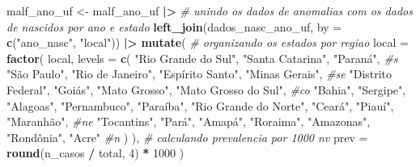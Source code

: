 \documentclass[
]{article}
\newenvironment{Shaded}{\begin{snugshade}}{\end{snugshade}}
\newcommand{\AttributeTok}[1]{\textcolor[rgb]{0.13,0.29,0.53}{#1}}
\newcommand{\CommentTok}[1]{\textcolor[rgb]{0.56,0.35,0.01}{\textit{#1}}}
\newcommand{\DecValTok}[1]{\textcolor[rgb]{0.00,0.00,0.81}{#1}}
\newcommand{\FunctionTok}[1]{\textcolor[rgb]{0.13,0.29,0.53}{\textbf{#1}}}
\newcommand{\NormalTok}[1]{#1}
\newcommand{\OtherTok}[1]{\textcolor[rgb]{0.56,0.35,0.01}{#1}}
\newcommand{\SpecialCharTok}[1]{\textcolor[rgb]{0.81,0.36,0.00}{\textbf{#1}}}
\newcommand{\StringTok}[1]{\textcolor[rgb]{0.31,0.60,0.02}{#1}}
\begin{document}
\begin{Shaded}
\begin{Highlighting}[]
\NormalTok{malf\_ano\_uf }\OtherTok{\textless{}{-}}\NormalTok{ malf\_ano\_uf }\SpecialCharTok{|\textgreater{}} 
  \CommentTok{\# unindo os dados de anomalias com os dados de nascidos por ano e estado}
  \FunctionTok{left\_join}\NormalTok{(dados\_nasc\_ano\_uf, }\AttributeTok{by =} \FunctionTok{c}\NormalTok{(}\StringTok{"ano\_nasc"}\NormalTok{, }\StringTok{"local"}\NormalTok{)) }\SpecialCharTok{|\textgreater{}} 
  \FunctionTok{mutate}\NormalTok{(}
    \CommentTok{\# organizando os estados por regiao}
    \AttributeTok{local =} \FunctionTok{factor}\NormalTok{(}
\NormalTok{      local,}
      \AttributeTok{levels =} \FunctionTok{c}\NormalTok{(}
        \StringTok{"Rio Grande do Sul"}\NormalTok{, }\StringTok{"Santa Catarina"}\NormalTok{, }\StringTok{"Paraná"}\NormalTok{, }\CommentTok{\#s}
        \StringTok{"São Paulo"}\NormalTok{, }\StringTok{"Rio de Janeiro"}\NormalTok{, }\StringTok{"Espírito Santo"}\NormalTok{, }\StringTok{"Minas Gerais"}\NormalTok{, }\CommentTok{\#se}
        \StringTok{"Distrito Federal"}\NormalTok{, }\StringTok{"Goiás"}\NormalTok{, }\StringTok{"Mato Grosso"}\NormalTok{, }\StringTok{"Mato Grosso do Sul"}\NormalTok{, }\CommentTok{\#co}
        \StringTok{"Bahia"}\NormalTok{, }\StringTok{"Sergipe"}\NormalTok{, }\StringTok{"Alagoas"}\NormalTok{, }\StringTok{"Pernambuco"}\NormalTok{, }\StringTok{"Paraíba"}\NormalTok{, }
        \StringTok{"Rio Grande do Norte"}\NormalTok{, }\StringTok{"Ceará"}\NormalTok{, }\StringTok{"Piauí"}\NormalTok{, }\StringTok{"Maranhão"}\NormalTok{, }\CommentTok{\#ne}
        \StringTok{"Tocantins"}\NormalTok{, }\StringTok{"Pará"}\NormalTok{, }\StringTok{"Amapá"}\NormalTok{, }\StringTok{"Roraima"}\NormalTok{, }\StringTok{"Amazonas"}\NormalTok{, }\StringTok{"Rondônia"}\NormalTok{, }\StringTok{"Acre"} \CommentTok{\#n}
\NormalTok{      )}
\NormalTok{    ),}
    \CommentTok{\# calculando prevalencia por 1000 nv}
    \AttributeTok{prev =} \FunctionTok{round}\NormalTok{(n\_casos }\SpecialCharTok{/}\NormalTok{ total, }\DecValTok{4}\NormalTok{) }\SpecialCharTok{*} \DecValTok{1000}
\NormalTok{  )}
\end{Highlighting}
\end{Shaded}
\end{document}
